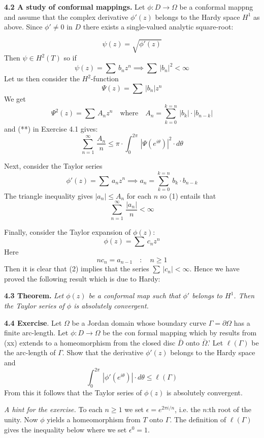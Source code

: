 \noindent
{\bf{4.2 A study
of conformal mappings.}}
Let $\phi\colon D\to \Omega$ be a conformal mappng
and assume that the complex derivative
$\phi'(z)$ belongs to the Hardy space $H^1$ as above.
Since $\phi'\neq 0$ in $D$ there exists a single-valued 
analytic square-root:


\[ 
\psi(z)=\sqrt{\phi'(z)}
\]
Then $\psi\in H^2(T)$ 
so if
\[ 
\psi(z)=\sum\, b_nz^n\implies \sum\, |b_n|^2<\infty
\]
\noindent
Let us then consider the $H^2$-function
\[
\Psi(z)= \sum\, |b_n|z^n
\]
We get
\[ 
\Psi^2(z)=\sum\,A_nz^n\quad\text{where}\quad
A_n=\sum_{k=0}^{k=n}\, |b_k|\cdot |b_{n-k}|
\]
and (**) in Exercise 4.1 gives:
\[
\sum_{n=1}^\infty
\,\frac{A_n}{n}\leq \pi\cdot \int_0^{2\pi}\,
|\Psi(e^{i\theta})|^2\cdot d\theta\tag{1}
\]



\noindent
Next, consider the Taylor series
\[ 
\phi'(z)= \sum\, a_nz^n\implies
a_n=\sum_{k=0}^{k=n}\, b_k\cdot b_{n-k}
\] 
The triangle inequality gives $|a_n|\leq A_n$ for each $n$
so (1) entails that
\[ 
\sum_{n=1}^\infty \, \frac{|a_n|}{n}<\infty\tag{2}
\]

\noindent
Finally, consider the Taylor expansion of $\phi(z)$:
\[
\phi(z)=\sum\, c_nz^n
\]
Here
\[ 
nc_n=a_{n-1}\quad\colon\quad n\geq 1
\]
Then it is clear that (2) implies that the series
$\sum\, |c_n|<\infty$. Hence we have proved the following result which is due to Hardy:

\medskip

\noindent
{\bf{4.3 Theorem.}}
\emph{
Let $\phi(z)$
be a conformal map such that
$\phi'$ belongs to $H^1$. Then the Taylor series of $\phi$ 
is absolutely convergent.}
\medskip

\noindent
{\bf{4.4 Exercise}}. Let $\Omega$ be a Jordan domain  whose boundary
curve
$\Gamma=\partial\Omega$ has a finite arc-length.
Let $\phi\colon D\to \Omega$ be the con formal mapping which by results from
(xx) extends to a homeomorphism from the closed disc
$\bar D$ onto $\bar\Omega$.'
Let $\ell(\Gamma)$ be the arc-length of $\Gamma$. Show that the derivative
$\phi'(z)$ belongs to the Hardy space and
\[
\int_0^{2\pi}\, |\phi'(e^{i\theta})|\cdot d\theta
\leq \ell(\Gamma)
\]
From this it follows that the Taylor series of $\phi(z)$ is absolutely convergent.
\medskip

\noindent
\emph{A hint for the exercise.}
To each $n\geq 1$ we set $\epsilon= e^{2\pi i/n}$, i.e. the $n$:th root of the unity.
Now
$\phi$ yields a homeomorphism from $T$ onto $\Gamma$.
The definition of $\ell(\Gamma)$ gives the inequality
below  where we set
$\epsilon^0=1$.

